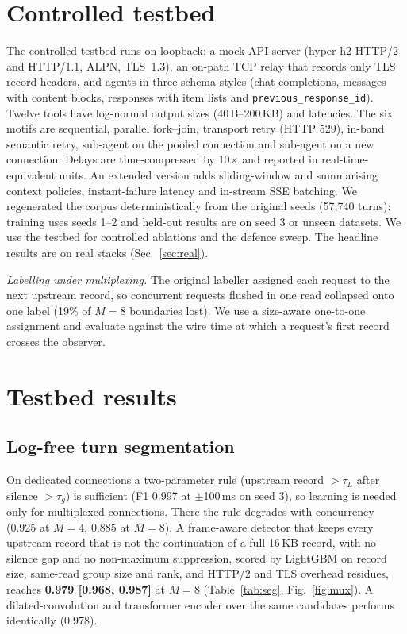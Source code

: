 \documentclass[journal]{IEEEtran}
\begin{document}
\section{Controlled testbed}
The controlled testbed runs on loopback: a mock API server (hyper-h2 HTTP/2 and HTTP/1.1, ALPN, TLS~1.3), an on-path TCP relay that records only TLS record headers, and agents in three schema styles (chat-completions, messages with content blocks, responses with item lists and \texttt{previous\_response\_id}). Twelve tools have log-normal output sizes (40\,B--200\,KB) and latencies. The six motifs are sequential, parallel fork--join, transport retry (HTTP 529), in-band semantic retry, sub-agent on the pooled connection and sub-agent on a new connection. Delays are time-compressed by 10$\times$ and reported in real-time-equivalent units. An extended version adds sliding-window and summarising context policies, instant-failure latency and in-stream SSE batching. We regenerated the corpus deterministically from the original seeds (57,740 turns): training uses seeds 1--2 and held-out results are on seed 3 or unseen datasets. We use the testbed for controlled ablations and the defence sweep. The headline results are on real stacks (Sec.~\ref{sec:real}).

\emph{Labelling under multiplexing.} The original labeller assigned each request to the next upstream record, so concurrent requests flushed in one read collapsed onto one label (19\% of $M{=}8$ boundaries lost). We use a size-aware one-to-one assignment and evaluate against the wire time at which a request's first record crosses the observer.

\section{Testbed results}
\subsection{Log-free turn segmentation}
On dedicated connections a two-parameter rule (upstream record $> \tau_L$ after silence $> \tau_g$) is sufficient (F1 0.997 at $\pm$100\,ms on seed 3), so learning is needed only for multiplexed connections. There the rule degrades with concurrency (0.925 at $M{=}4$, 0.885 at $M{=}8$). A frame-aware detector that keeps every upstream record that is not the continuation of a full 16\,KB record, with no silence gap and no non-maximum suppression, scored by LightGBM on record size, same-read group size and rank, and HTTP/2 and TLS overhead residues, reaches \textbf{0.979 [0.968, 0.987]} at $M{=}8$ (Table~\ref{tab:seg}, Fig.~\ref{fig:mux}). A dilated-convolution and transformer encoder over the same candidates performs identically (0.978).
\end{document}
